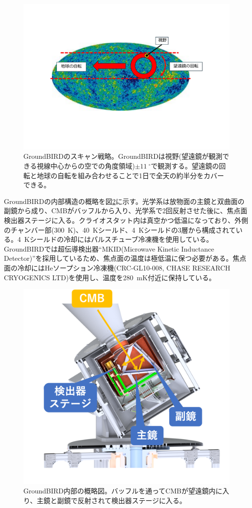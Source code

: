 \begin{figure}[htbp]
  \centering
  \includegraphics[width=0.8\columnwidth]{3_GB/figs/scan_strategy.pdf}
  \caption{GroundBIRDのスキャン戦略。GroundBIRDは視野(望遠鏡が観測できる視線中心からの空での角度領域)$\pm \SI{11}{^{\circ}}$で観測する。望遠鏡の回転と地球の自転を組み合わせることで1日で全天の約半分をカバーできる。}
  \label{scan_strategy}
\end{figure}

GroundBIRDの内部構造の概略を図\ref{GB_inside}に示す。光学系は放物面の主鏡と双曲面の副鏡から成り、CMBがバッフルから入り、光学系で2回反射させた後に、焦点面検出器ステージに入る。クライオスタット内は真空かつ低温になっており、外側のチャンバー部(\SI{300}{K})、\SI{40}{K}シールド、\SI{4}{K}シールドの3層から構成されている。\SI{4}{K}シールドの冷却にはパルスチューブ冷凍機を使用している。GroundBIRDでは超伝導検出器``MKID(Microwave Kinetic Inductance Detector)\cite{MKID_res}''を採用しているため、焦点面の温度は極低温に保つ必要がある。焦点面の冷却にはHeソープション冷凍機(CRC-GL10-008, CHASE RESEARCH CRYOGENICS LTD)を使用し、温度を\SI{280}{mK}付近に保持している。

\begin{figure}[htbp]
  \centering
  \includegraphics[width=0.6\columnwidth]{3_GB/figs/gb_int.png}
  \caption{GroundBIRD内部の概略図。バッフルを通ってCMBが望遠鏡内に入り、主鏡と副鏡で反射されて検出器ステージに入る。}
  \label{GB_inside}
\end{figure}


